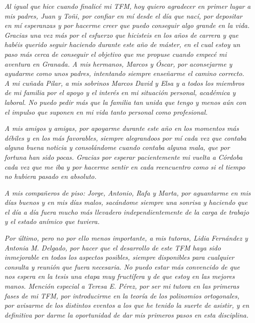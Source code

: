 

    \textit{Al igual que hice cuando finalicé mi TFM, hoy quiero agradecer en primer lugar a mis padres, Juan y Toñi, por confiar en mí desde el día que nací, por depositar en mí esperanzas y por hacerme creer que puedo conseguir algo grande en la vida. Gracias una vez más por el esfuerzo que hicisteis en los años de carrera y que habéis querido seguir haciendo durante este año de máster, en el cual estoy un paso más cerca de conseguir el objetivo que me propuse cuando empecé mi aventura en Granada. A mis hermanos, Marcos y Óscar, por aconsejarme y ayudarme como unos padres, intentando siempre enseñarme el camino correcto. A mi cuñada Pilar, a mis sobrinos Marcos David y Elsa y a todos los miembros de mi familia por el apoyo y el interés en mi situación personal, académica y laboral. No puedo pedir más que la familia tan unida que tengo y menos aún con el impulso que suponen en mi vida tanto personal como profesional.}
    \vspace{0.5cm}

    \textit{A mis amigos y amigas, por apoyarme durante este año en los momentos más débiles y en los más favorables, siempre alegrandoos por mí cada vez que contaba alguna buena noticia y consolándome cuando contaba alguna mala, que por fortuna han sido pocas. Gracias por esperar pacientemente mi vuelta a Córdoba cada vez que me iba y por hacerme sentir en cada reencuentro como si el tiempo no hubiera pasado en absoluto.}
    \vspace{0.5cm}

    \textit{A mis compañeros de piso: Jorge, Antonio, Rafa y Marta, por aguantarme en mis días buenos y en mis días malos, sacándome siempre una sonrisa y haciendo que el día a día fuera mucho más llevadero independientemente de la carga de trabajo y el estado anímico que tuviera.}
    \vspace{0.5cm}

    \textit{Por último, pero no por ello menos importante, a mis tutoras, Lidia Fernández y Antonia M. Delgado, por hacer que el desarrollo de este TFM haya sido inmejorable en todos los aspectos posibles, siempre disponibles para cualquier consulta y reunión que fuera necesaria. No puedo estar más convencido de que nos espera en la tesis una etapa muy fructífera y de que estoy en las mejores manos. Mención especial a Teresa E. Pérez, por ser mi tutora en las primeras fases de mi TFM, por introducirme en la teoría de los polinomios ortogonales, por avisarme de los distintos eventos a los que he tenido la suerte de asistir, y en definitiva por darme la oportunidad de dar mis primeros pasos en esta disciplina.}
